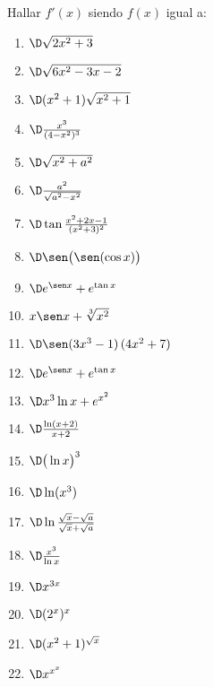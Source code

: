 \item Hallar $f'(x)$ siendo $f(x)$ igual a:
\begin{multicols}{2}
\begin{enumerate}
    \item $\D \sqrt{2x^2+3}$
    \item $\D \sqrt{6x^2-3x-2}$
    \item $\D (x^2+1)\sqrt{x^2+1}$
    \item $\D \frac{x^3}{(4-x^2)^3}$
    \item $\D \sqrt{x^2+a^2}$
    \item $\D \frac{a^2}{\sqrt{a^2-x^2}}$
    \item $\D \tan \frac{x^2+2x-1}{(x^2+3)^2}$
    \item $\D \sen\big(\sen(\cos x)\big)$
    \item $\D e^{\sen x}+e^{\tan x}$
    \item $x \sen x+\sqrt[3]{x^2}$
    \item $\D \sen(3x^3-1) \, (4x^2+7)$
    \item $\D e^{\sen x} + e^{\tan x}$
    \item $\D x^3\ln x+e^{x^2}$
    \item $\D \frac{\ln(x+2)}{x+2}$
    \item $\D \big(\ln x\big)^3$
    \item $\D \ln (x^3)$
    \item $\D \ln \frac{\sqrt x-\sqrt a}{\sqrt x+\sqrt a}$
    \item $\D \frac{x^3}{\ln x}$
    \item $\D x^{3x}$
    \item $\D (2^x)^x$
    \item $\D (x^2+1)^{\sqrt x}$
    \item $\D x^{x^x}$
\end{enumerate}
\end{multicols}
